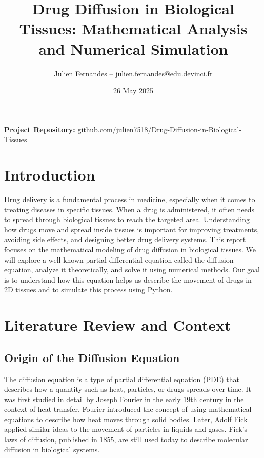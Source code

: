 \documentclass[11pt, a4paper]{article}
\title{Drug Diffusion in Biological Tissues: Mathematical Analysis and Numerical Simulation}
\author{Julien Fernandes -- \href{mailto:julien.fernandes@edu.devinci.fr}{julien.fernandes@edu.devinci.fr}}
\date{26 May 2025}
\begin{document}
\maketitle
\begin{center}
\end{center}

\vspace{1cm}
\noindent\textbf{Project Repository:} \href{https://github.com/julien7518/Drug-Diffusion-in-Biological-Tissues}{github.com/julien7518/Drug-Diffusion-in-Biological-Tissues}
\hypersetup{linktoc=all}
\tableofcontents
\newpage

\section{Introduction}
Drug delivery is a fundamental process in medicine, especially when it comes to treating diseases in specific tissues.
When a drug is administered, it often needs to spread through biological tissues to reach the targeted area.
Understanding how drugs move and spread inside tissues is important for improving treatments, avoiding side effects, and designing better drug delivery systems.
This report focuses on the mathematical modeling of drug diffusion in biological tissues. We will explore a well-known partial differential equation called the diffusion equation, analyze it theoretically, and solve it using numerical methods.
Our goal is to understand how this equation helps us describe the movement of drugs in 2D tissues and to simulate this process using Python.

\section{Literature Review and Context}

\subsection{Origin of the Diffusion Equation}
The diffusion equation is a type of partial differential equation (PDE) that describes how a quantity such as heat, particles, or drugs spreads over time.
It was first studied in detail by Joseph Fourier in the early 19th century in the context of heat transfer.
Fourier introduced the concept of using mathematical equations to describe how heat moves through solid bodies.
Later, Adolf Fick applied similar ideas to the movement of particles in liquids and gases. Fick’s laws of diffusion, published in 1855, are still used today to describe molecular diffusion in biological systems.
\end{document}
